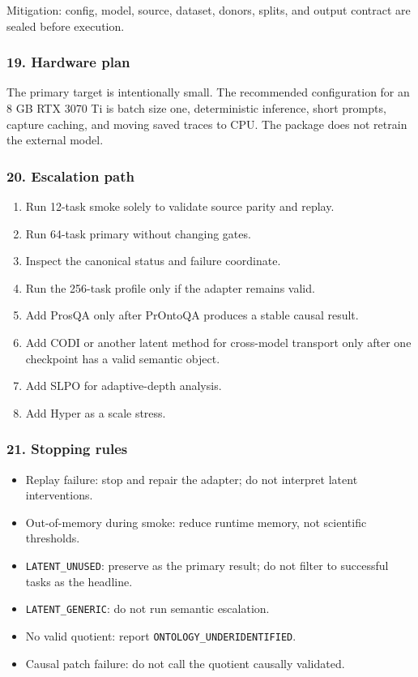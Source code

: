 \documentclass[
  10pt,
]{article}
\providecommand{\tightlist}{%
  \setlength{\itemsep}{0pt}\setlength{\parskip}{0pt}}
\begin{document}
Mitigation: config, model, source, dataset, donors, splits, and output
contract are sealed before execution.

\subsubsection{19. Hardware plan}\label{hardware-plan}

The primary target is intentionally small. The recommended configuration
for an 8 GB RTX 3070 Ti is batch size one, deterministic inference,
short prompts, capture caching, and moving saved traces to CPU. The
package does not retrain the external model.

\subsubsection{20. Escalation path}\label{escalation-path}

\begin{enumerate}
\def\labelenumi{\arabic{enumi}.}
\tightlist
\item
  Run 12-task smoke solely to validate source parity and replay.
\item
  Run 64-task primary without changing gates.
\item
  Inspect the canonical status and failure coordinate.
\item
  Run the 256-task profile only if the adapter remains valid.
\item
  Add ProsQA only after PrOntoQA produces a stable causal result.
\item
  Add CODI or another latent method for cross-model transport only after
  one checkpoint has a valid semantic object.
\item
  Add SLPO for adaptive-depth analysis.
\item
  Add Hyper as a scale stress.
\end{enumerate}

\subsubsection{21. Stopping rules}\label{stopping-rules}

\begin{itemize}
\tightlist
\item
  Replay failure: stop and repair the adapter; do not interpret latent
  interventions.
\item
  Out-of-memory during smoke: reduce runtime memory, not scientific
  thresholds.
\item
  \texttt{LATENT\_UNUSED}: preserve as the primary result; do not filter
  to successful tasks as the headline.
\item
  \texttt{LATENT\_GENERIC}: do not run semantic escalation.
\item
  No valid quotient: report \texttt{ONTOLOGY\_UNDERIDENTIFIED}.
\item
  Causal patch failure: do not call the quotient causally validated.
\end{itemize}
\end{document}
